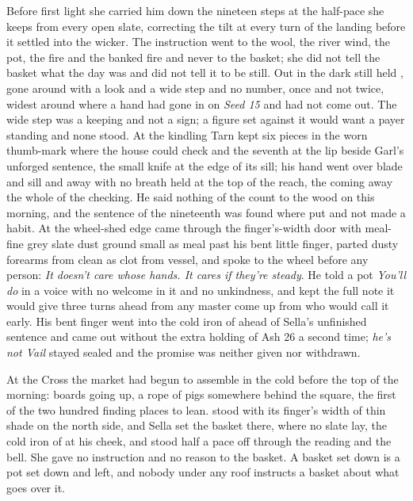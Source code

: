 Before first light she carried him down the nineteen steps at the half-pace she keeps from every open slate, correcting the tilt at every turn of the landing before it settled into the wicker. The instruction went to the wool, the river wind, the pot, the fire and the banked fire and never to the basket; she did not tell the basket what the day was and did not tell it to be still. Out in  the dark still held , gone around with a look and a wide step and no number, once and not twice, widest around  where a hand had gone in on \emph{Seed 15} and had not come out. The wide step was a keeping and not a sign; a figure set against it would want a payer standing and none stood. At the kindling Tarn kept six pieces in the worn thumb-mark where the house could check and the seventh at the lip beside Garl's unforged sentence, the small knife at the edge of its sill; his hand went over blade and sill and away with no breath held at the top of the reach, the coming away the whole of the checking. He said nothing of the count to the wood on this morning, and the sentence of the nineteenth was found where put and not made a habit. At the wheel-shed edge  came through the finger's-width door with meal-fine grey slate dust ground small as meal past his bent little finger, parted dusty forearms from clean as clot from vessel, and spoke to the wheel before any person: \emph{It doesn't care whose hands. It cares if they're steady}. He told a pot \emph{You'll do} in a voice with no welcome in it and no unkindness, and kept the full note it would give three turns ahead from any master come up from  who would call it early. His bent finger went into the cold iron of  ahead of Sella's unfinished sentence and came out without the extra holding of Ash 26 a second time; \emph{he's not Vail} stayed sealed and the promise was neither given nor withdrawn.

\scenebreak

At the Cross the market had begun to assemble in the cold before the top of the morning: boards going up, a rope of pigs somewhere behind the square, the first of the two hundred finding places to lean.  stood with its finger's width of thin shade on the north side, and Sella set the basket there, where no slate lay, the cold iron of  at his cheek, and stood half a pace off through the reading and the bell. She gave no instruction and no reason to the basket. A basket set down is a pot set down and left, and nobody under any roof instructs a basket about what goes over it.

